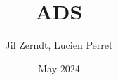 \documentclass[a4paper, fontsize = 8pt, landscape]{scrartcl}
\title{ADS}
\author{Jil Zerndt, Lucien Perret}
\date{May 2024}
\begin{document}
\begin{multicols}{3}
	\thispagestyle{TitlePageStyle}
	\maketitle
	\raggedcolumns
\end{multicols}
\end{document}
